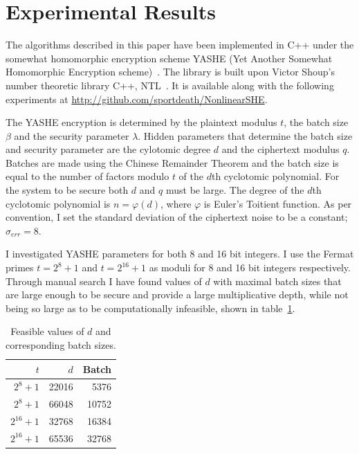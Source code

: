 \documentclass{article}
\begin{document}
    \section{Experimental Results}
    \label{exp}

        The algorithms described in this paper have been implemented in C++ 
        under the
        somewhat homomorphic encryption scheme YASHE (Yet Another Somewhat Homomorphic Encryption scheme)~\cite{yashe}.
        The library is built upon Victor Shoup's number theoretic library C++, NTL~\cite{ntl}.
        It is available along with the following experiments at \url{http://github.com/sportdeath/NonlinearSHE}.

        The YASHE encryption is determined by the plaintext modulus $t$, the batch size $\beta$ and the security parameter $\lambda$.
        Hidden parameters that determine the batch size and security parameter are the cylotomic degree $d$ and the ciphertext modulus $q$.
        Batches are made using the Chinese Remainder Theorem and the batch size is equal to the number of factors modulo $t$ of the $d$th cyclotomic polynomial.
        For the system to be secure both $d$ and $q$ must be large.
        The degree of the $d$th cyclotomic polynomial is $n = \varphi(d)$, where $\varphi$ is Euler's Toitient function.
        As per convention, I set the standard deviation of the ciphertext noise to be a constant; $\sigma_{err} = 8$.

        I investigated YASHE parameters for both 8 and 16 bit integers.
        I use the Fermat primes 
        $t = 2^8 + 1$ 
        and $t = 2^{16} + 1$ as moduli for 8 and 16 bit integers respectively.
        Through manual search I have found values of $d$ 
        with maximal batch sizes that are
        large enough to be secure and provide a large multiplicative depth,
        while not being so large as to be computationally infeasible, shown in table~\ref{tab2}.

        \begin{table}[h]
        \begin{center}
            \begin{tabular}{| r | r | r |}
                \hline
                $t$ & $d$ & Batch
                \\ \hline
                $2^8 + 1$ & 22016 & 5376
                \\ \hline
                $2^8 + 1$ & 66048 & 10752
                \\ \hline
                $2^{16} + 1$ & 32768 & 16384
                \\ \hline
                $2^{16} + 1$ & 65536 & 32768
                \\ \hline
            \end{tabular}
        \end{center}
        \caption{Feasible values of $d$ and corresponding batch sizes.}
        \label{tab2}
        \end{table}
\end{document}
